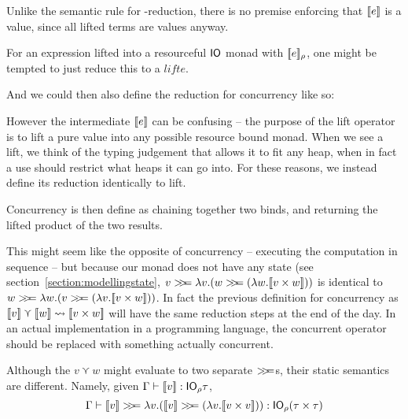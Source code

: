 Unlike the semantic rule for \beta-reduction, there is no premise
enforcing that $\lift{e}$ is a value, since all lifted terms are
values anyway.

For an expression lifted into a resourceful $\IO$ monad with
$\use{\rho}{e}$, one might be tempted to just reduce this to a $lift{e}$.
\begin{mathpar}
\end{mathpar}

And we could then also define the reduction for concurrency like so:
\begin{mathpar}
\end{mathpar}

However the intermediate $\lift{e}$ can be confusing -- the purpose of
the lift operator is to lift a pure value into any possible resource
bound monad. When we see a lift, we think of the typing judgement that
allows it to fit any heap, when in fact a use should restrict what
heaps it can go into. For these reasons, we instead define its
reduction identically to lift.
\begin{mathpar}
\end{mathpar}

Concurrency is then define as chaining together two binds, and
returning the lifted product of the two results.
\begin{mathpar}
\end{mathpar}

This might seem like the opposite of concurrency -- executing the
computation in sequence -- but because our monad does not have any
state (see section~\ref{section:modellingstate},
${v \bind \lambda v . (w \bind (\lambda w . \lift{v \times w}))}$ is identical to
$w \bind \lambda w . (v \bind (\lambda v . \lift{v \times w}))$. In fact the previous
definition for concurrency as
$\lift{v} \curlyvee \lift{w} \leadsto \llbracket v \times w\rrbracket$ will have the same reduction steps at
the end of the day. In an actual implementation in a programming
language, the concurrent operator should be replaced with something
actually concurrent.

Although the $v \curlyvee w$ might evaluate to two separate $\bind$s, their
static semantics are different. Namely, given
$\Gamma \vdash \lift{v} : \IO_\rho \tau$,
$$
\Gamma \vdash \lift{v} \bind \lambda v . (\lift{v} \bind (\lambda v . \lift{v \times v})) : \IO_\rho (\tau \times \tau)
$$

